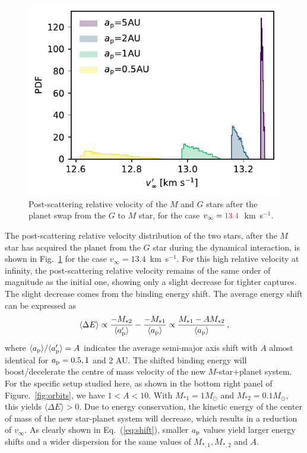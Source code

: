 \documentclass[twocolumn]{aastex62}
\begin{document}
\begin{figure}
  \includegraphics[width=0.9\columnwidth]{letter-v}
  \caption{Post-scattering relative velocity of the $M$ and  $G$ stars after the planet swap from the  $G$ to $M$ star, for the case 
   $v_\infty={\color{red}13.4}$~km~s$^{-1}$.}
 \label{fig:velocity}
\end{figure}


The post-scattering relative velocity distribution of the two stars,  after the $M$ star has  acquired the planet from the $G$ star during the dynamical
interaction, is shown in Fig.~\ref{fig:velocity}
for the case $v_\infty=13.4$~km~s$^{-1}$. For this high relative velocity at infinity, the post-scattering relative velocity remains of the same order of magnitude as the initial one, showing only a slight decrease for tighter
captures.  The slight decrease comes from the binding energy shift. The average energy shift can be expressed as
\begin{equation}\label{eq:shift}
\langle \Delta E \rangle \propto \frac{-M_{*2}}{\langle a_{\rm p}^\prime \rangle} - \frac{-M_{*1}}{\langle a_{\rm p} \rangle }\propto \frac{M_{*1}-AM_{*2}}{\langle a_{\rm p} \rangle}\,,
\end{equation}
where $\langle a_{\rm p} \rangle /\langle a_{\rm p}^\prime \rangle =A$ indicates the average semi-major axis shift with $A$ almost identical for $a_{\rm p}=0.5,1$ and $2$ AU. The shifted binding energy will boost/decelerate the centre of mass velocity of the new $M$-star+planet system. For the specific setup studied here, as shown in the bottom right panel of Figure.~\ref{fig:orbits}, we have $1<A<10$. With $M_{*1}=1M_\odot$ and $M_{*2}=0.1M_\odot$, this yields $\langle \Delta E\rangle > 0$. Due to  energy conservation, the kinetic energy of the center of mass of the new star-planet system will decrease, which results in a reduction of $v_\infty$. As clearly shown in Eq.~(\ref{eq:shift}), smaller $a_{\rm p}$ values yield larger energy shifts and a wider dispersion for the same values of 
$M_{*,1}, M_{*,2}$ and
 $A$. 
\end{document}
